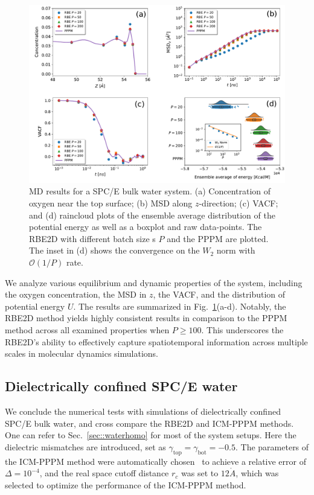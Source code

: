 \begin{figure}[ht!]
\centering
\includegraphics[width=0.90\linewidth]{figs/Density_new.pdf}
	\caption{MD results for a SPC/E bulk water system. (a)  Concentration of oxygen near the top surface; (b)  MSD along $z$-direction; (c)  VACF; and (d)  raincloud plots of the ensemble average distribution of the potential energy as well as a boxplot and raw data-points. The RBE2D with different batch size {s} $P$ and the PPPM are plotted. The inset in (d) shows the convergence on the $W_2$ norm with $\mathcal{O}(1/P)$ rate.}
	\label{fig:Water}
\end{figure}

We analyze various equilibrium and dynamic properties of the system, including the oxygen concentration, the MSD in $z$, the VACF, and the distribution of potential energy $U$.
The results are summarized in Fig.~\ref{fig:Water}(a-d).
Notably, the RBE2D method yields highly consistent results in comparison to the PPPM method across all examined properties when $P \geq 100$. 
This underscores the RBE2D's ability to effectively capture spatiotemporal information across multiple scales in molecular dynamics simulations.

\subsection{Dielectrically confined SPC/E water}

We conclude the numerical tests with simulations of dielectrically confined SPC/E bulk water, and cross compare the RBE2D and ICM-PPPM methods. 
One can refer to Sec.~\ref{sec::waterhomo} for most of the system setups.
Here the dielectric mismatches are introduced, set as $\gamma_{\text{top}}=\gamma_{\text{bot}}=-0.5$. 
The parameters of the ICM-PPPM method were automatically chosen~\cite{kolafa1992cutoff} to achieve a relative error of $\Delta=10^{-4}$, and the real space cutoff distance $r_c$ was set to $12\mathring{A}$, which was selected to optimize the performance of the ICM-PPPM method. 

